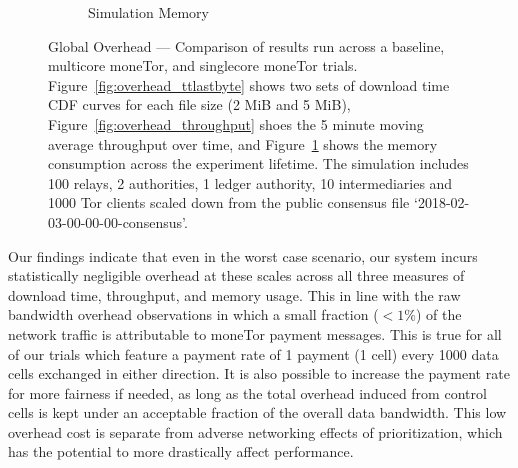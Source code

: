 \begin{figure}
\begin{subfigure}[t]{0.32\textwidth}
		\caption{Simulation Memory}
		\label{fig:overhead_shadow}
	\end{subfigure}
	\caption{Global Overhead --- Comparison of results run across a
          baseline, multicore moneTor, and singlecore moneTor
          trials. Figure~\ref{fig:overhead_ttlastbyte} shows two sets of
          download time CDF curves for each file size (2 MiB and 5 MiB),
          Figure~\ref{fig:overhead_throughput} shoes the 5 minute moving average
          throughput over time, and Figure~\ref{fig:overhead_shadow} shows the
          memory consumption across the experiment lifetime. The simulation
          includes 100 relays, 2 authorities, 1 ledger authority, 10
          intermediaries and 1000 Tor clients scaled down from the public
          consensus file `2018-02-03-00-00-00-consensus'.}
	\label{fig:overhead}
\end{figure}

Our findings indicate that even in the worst case scenario, our system incurs
statistically negligible overhead at these scales across all three measures of
download time, throughput, and memory usage. This in line with the raw bandwidth
overhead observations in which a small fraction ($< 1\%$) of the network traffic
is attributable to moneTor payment messages. This is true for all of our trials
which feature a payment rate of 1 payment (1 cell) every 1000 data cells
exchanged in either direction. It is also possible to increase the payment rate
for more fairness if needed, as long as the total overhead induced from control
cells is kept under an acceptable fraction of the overall data bandwidth. This
low overhead cost is separate from adverse networking effects of prioritization,
which has the potential to more drastically affect performance.


